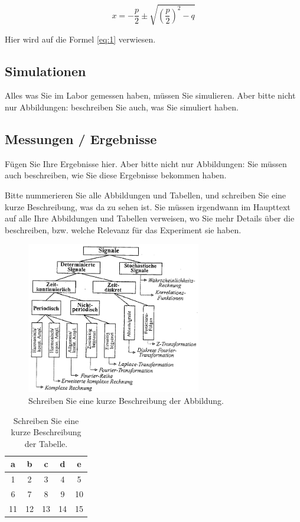 \documentclass[12pt,a4paper]{article}
\begin{document}
	\begin{equation}\label{eq:1}
		x=-\frac{p}{2}\pm\sqrt{\left(\frac{p}{2}\right)^2-q}
	\end{equation}

	Hier wird auf die Formel  \ref{eq:1} verwiesen. %

	\subsection{Simulationen}
	Alles was Sie im Labor gemessen haben, müssen Sie 
	simulieren. Aber bitte nicht nur Abbildungen: beschreiben 
	Sie auch, was Sie simuliert haben.
		
	\pagebreak

	\subsection{Messungen / Ergebnisse}
	Fügen Sie Ihre Ergebnisse hier. Aber bitte nicht nur Abbildungen: Sie müssen auch beschreiben, wie Sie diese Ergebnisse 
	bekommen haben.
	
	Bitte nummerieren Sie alle Abbildungen und Tabellen, und schreiben Sie eine kurze Beschreibung, was da zu sehen ist. Sie müssen 
	irgendwann im Haupttext auf alle Ihre Abbildungen und Tabellen verweisen, wo Sie mehr Details über die beschreiben, bzw. 
	welche Relevanz für das Experiment sie haben. 
	
	\begin{figure}[H]
		\centering
		\includegraphics[width=3in]{signale_math_methoden.png}
		\caption{Schreiben Sie eine kurze Beschreibung der Abbildung.}
		\label{figure:1}
	\end{figure}
	
	\begin{table}[H]
		\centering
		\begin{tabular}{|c|c|c|c|c|}
			\hline
			a&b  &c  &d  &e     \\
			\hline
			\hline
			1&2  &3  &4  &5     \\
			6&7  &8  & 9 &10    \\
			11&12  &13  &14  &15\\
			\hline              
		\end{tabular}
	\caption{Schreiben Sie eine kurze Beschreibung der Tabelle.}
	\label{table:1}
	\end{table}
	
\end{document}
